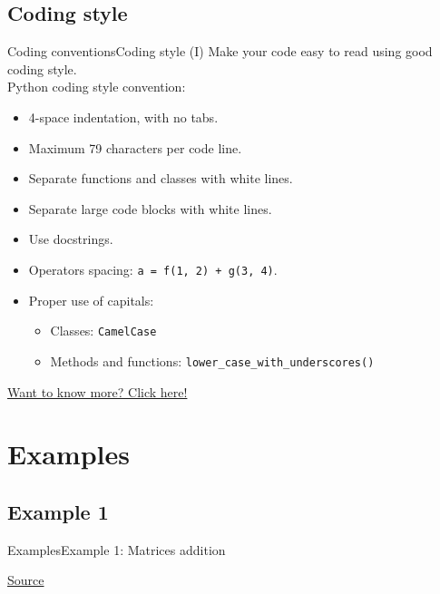 \documentclass[10pt,compress]{beamer} %
\begin{document}
\subsection{Coding style}
\begin{frame}{Coding conventions}{Coding style (I)}
	Make your code easy to read using good coding style.\\
	Python coding style convention:
	\begin{itemize}
		\item 4-space indentation, with no tabs.
		\item Maximum 79 characters per code line.
		\item Separate functions and classes with white lines.
		\item Separate large code blocks with white lines.
		\item Use docstrings.
		\item Operators spacing: \texttt{a = f(1, 2) + g(3, 4)}.
		\item Proper use of capitals: 
			\begin{itemize}
			\item Classes: \texttt{CamelCase}
			\item Methods and functions: \texttt{lower\_case\_with\_underscores()}
			\end{itemize}
	\end{itemize}
	\alert{\href{http://mundogeek.net/traducciones/guia-estilo-python.htm}{Want to know more? Click here!}}
\end{frame}

\section{Examples}

\subsection{Example 1}
\begin{frame}{Examples}{Example 1: Matrices addition}
	\begin{block}{}
	\vspace{-0.2cm}
	
	\vspace{-0.2cm}
	\end{block}
	\vspace{-0.2cm}
	\tiny{\href{http://www.programiz.com/python-programming/examples/add-matrix}{Source}}
\end{frame}
\end{document}
